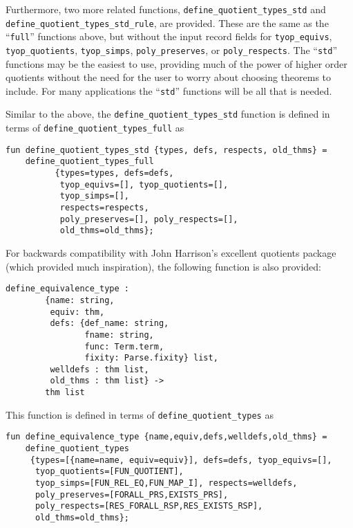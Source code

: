 \documentclass[envcountsame,runningheads]{llncs}
\begin{document}
Furthermore, two more related functions,
{\tt define\_quotient\_types\_std} and
{\tt define\_quotient\_types\_std\_rule},
are provided.
These are the same as the ``{\tt full}'' functions above, but
without the input record fields for
{\tt tyop\_equivs},
{\tt tyop\_quotients},
{\tt tyop\_simps},
{\tt poly\_preserves}, or
{\tt poly\_respects}.
The ``{\tt std}'' functions may be the easiest to use, providing much of the
power of higher order quotients without the need for the user
to worry about choosing theorems to include.
For many applications the ``{\tt std}'' functions will be all that is needed.

Similar to the above,
the {\tt define\_quotient\_types\_std} function
is defined in terms of {\tt define\_quotient\_types\_full} as

\begin{verbatim}
fun define_quotient_types_std {types, defs, respects, old_thms} =
    define_quotient_types_full
          {types=types, defs=defs,
           tyop_equivs=[], tyop_quotients=[],
           tyop_simps=[],
           respects=respects,
           poly_preserves=[], poly_respects=[],
           old_thms=old_thms};
\end{verbatim}

For backwards compatibility with John Harrison's excellent quotients package \cite{Har98}
(which provided much inspiration),
the following function is also provided:

\begin{verbatim}
define_equivalence_type :
        {name: string,
         equiv: thm,
         defs: {def_name: string,
                fname: string,
                func: Term.term,
                fixity: Parse.fixity} list,
         welldefs : thm list,
         old_thms : thm list} ->
        thm list
\end{verbatim}

\noindent
This function is defined in terms of {\tt define\_quotient\_types} as

\begin{verbatim}
fun define_equivalence_type {name,equiv,defs,welldefs,old_thms} =
    define_quotient_types
     {types=[{name=name, equiv=equiv}], defs=defs, tyop_equivs=[],
      tyop_quotients=[FUN_QUOTIENT],
      tyop_simps=[FUN_REL_EQ,FUN_MAP_I], respects=welldefs,
      poly_preserves=[FORALL_PRS,EXISTS_PRS],
      poly_respects=[RES_FORALL_RSP,RES_EXISTS_RSP],
      old_thms=old_thms};
\end{verbatim}
\end{document}
